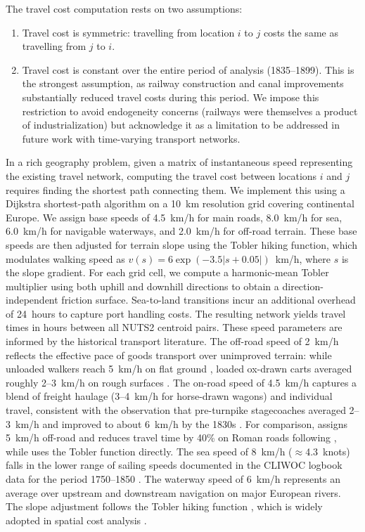 \documentclass[letterpaper,12pt,leqno]{article}
\begin{document}
The travel cost computation rests on two assumptions:
\begin{enumerate}
  \item Travel cost is symmetric: travelling from location \(i\) to \(j\) costs the same as travelling from \(j\) to \(i\).
  \item Travel cost is constant over the entire period of analysis (1835--1899). This is the strongest assumption, as railway construction and canal improvements substantially reduced travel costs during this period. We impose this restriction to avoid endogeneity concerns (railways were themselves a product of industrialization) but acknowledge it as a limitation to be addressed in future work with time-varying transport networks.
\end{enumerate}
In a rich geography problem, given a matrix of instantaneous speed representing the existing travel network, computing the travel cost between locations \(i\) and \(j\) requires finding the shortest path connecting them. We implement this using a Dijkstra shortest-path algorithm on a 10~km resolution grid covering continental Europe.
We assign base speeds of 4.5~km/h for main roads, 8.0~km/h for sea, 6.0~km/h for navigable waterways, and 2.0~km/h for off-road terrain. These base speeds are then adjusted for terrain slope using the Tobler hiking function, which modulates walking speed as \(v(s) = 6 \exp(-3.5 |s + 0.05|)\)~km/h, where \(s\) is the slope gradient. For each grid cell, we compute a harmonic-mean Tobler multiplier using both uphill and downhill directions to obtain a direction-independent friction surface. Sea-to-land transitions incur an additional overhead of 24~hours to capture port handling costs. The resulting network yields travel times in hours between all NUTS2 centroid pairs.
These speed parameters are informed by the historical transport literature. The off-road speed of 2~km/h reflects the effective pace of goods transport over unimproved terrain: while unloaded walkers reach 5~km/h on flat ground \citep{tobler1993three}, loaded ox-drawn carts averaged roughly 2--3~km/h on rough surfaces \citep{rodrigue2020geography}. The on-road speed of 4.5~km/h captures a blend of freight haulage (3--4~km/h for horse-drawn wagons) and individual travel, consistent with the observation that pre-turnpike stagecoaches averaged 2--3~km/h and improved to about 6~km/h by the 1830s \citep{rodrigue2020geography}. For comparison, \citet{allen2024topography} assigns 5~km/h off-road and reduces travel time by 40\% on Roman roads following \citet{davey1994road}, while \citet{ozak2018distance} uses the Tobler function directly. The sea speed of 8~km/h (\(\approx\)4.3~knots) falls in the lower range of sailing speeds documented in the CLIWOC logbook data for the period 1750--1850 \citep{kelly2019speed}. The waterway speed of 6~km/h represents an average over upstream and downstream navigation on major European rivers. The slope adjustment follows the Tobler hiking function \citep{tobler1993three}, which is widely adopted in spatial cost analysis \citep{ozak2018distance, allen2024topography}.
\end{document}
